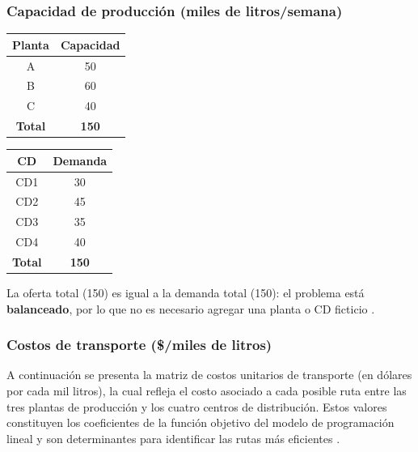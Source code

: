 \documentclass[12pt,a4paper]{article}
\begin{document}
\subsubsection{Capacidad de producci\'{o}n (miles de litros/semana)}

\begin{table}[H]
  \centering
  \begin{tabular}{|c|c|}
    \hline
    \textbf{Planta} & \textbf{Capacidad} \\
    \hline
    A & 50 \\
    B & 60 \\
    C & 40 \\
    \hline
    \textbf{Total} & \textbf{150} \\
    \hline
  \end{tabular}
  \hspace{2cm}
  \begin{tabular}{|c|c|}
    \hline
    \textbf{CD} & \textbf{Demanda} \\
    \hline
    CD1 & 30 \\
    CD2 & 45 \\
    CD3 & 35 \\
    CD4 & 40 \\
    \hline
    \textbf{Total} & \textbf{150} \\
    \hline
  \end{tabular}
\end{table}

\begin{cajaobs}
La oferta total (150) es igual a la demanda total (150): el problema est\'{a}
\textbf{balanceado}, por lo que no es necesario agregar una planta o CD ficticio \cite{taha2012}.
\end{cajaobs}

\subsubsection{Costos de transporte (\$/miles de litros)}

A continuaci\'{o}n se presenta la matriz de costos unitarios de transporte
 (en d\'{o}lares por cada mil litros), la cual refleja el costo asociado a cada 
 posible ruta entre las tres plantas de producci\'{o}n y los cuatro centros de 
 distribuci\'{o}n. Estos valores constituyen los coeficientes de la funci\'{o}n objetivo 
 del modelo de programaci\'{o}n lineal y son determinantes para identificar 
 las rutas m\'{a}s eficientes \cite{hillier2015}.
\end{document}
